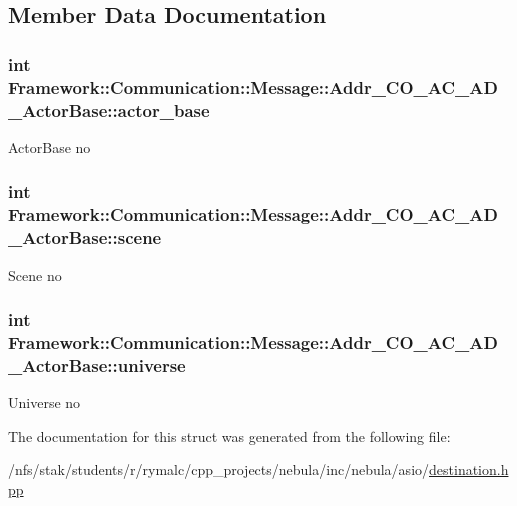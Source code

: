 \subsection{Member Data Documentation}
\hypertarget{structFramework_1_1Communication_1_1Message_1_1Addr__CO__AC__AD__ActorBase_a54bdb7a14936ed694579f2711cc0a944}{
\subsubsection[{actor\_\-base}]{\setlength{\rightskip}{0pt plus 5cm}int {\bf Framework::Communication::Message::Addr\_\-CO\_\-AC\_\-AD\_\-ActorBase::actor\_\-base}}}
\label{structFramework_1_1Communication_1_1Message_1_1Addr__CO__AC__AD__ActorBase_a54bdb7a14936ed694579f2711cc0a944}


ActorBase no \hypertarget{structFramework_1_1Communication_1_1Message_1_1Addr__CO__AC__AD__ActorBase_a8818968c075199228003a97444b6b3a7}{
\subsubsection[{scene}]{\setlength{\rightskip}{0pt plus 5cm}int {\bf Framework::Communication::Message::Addr\_\-CO\_\-AC\_\-AD\_\-ActorBase::scene}}}
\label{structFramework_1_1Communication_1_1Message_1_1Addr__CO__AC__AD__ActorBase_a8818968c075199228003a97444b6b3a7}


Scene no \hypertarget{structFramework_1_1Communication_1_1Message_1_1Addr__CO__AC__AD__ActorBase_a9f3a5f278fc66d6275e619495ce4ccc6}{
\subsubsection[{universe}]{\setlength{\rightskip}{0pt plus 5cm}int {\bf Framework::Communication::Message::Addr\_\-CO\_\-AC\_\-AD\_\-ActorBase::universe}}}
\label{structFramework_1_1Communication_1_1Message_1_1Addr__CO__AC__AD__ActorBase_a9f3a5f278fc66d6275e619495ce4ccc6}


Universe no 

The documentation for this struct was generated from the following file:\begin{DoxyCompactItemize}
\item 
/nfs/stak/students/r/rymalc/cpp\_\-projects/nebula/inc/nebula/asio/\hyperlink{destination_8hpp}{destination.hpp}\end{DoxyCompactItemize}
